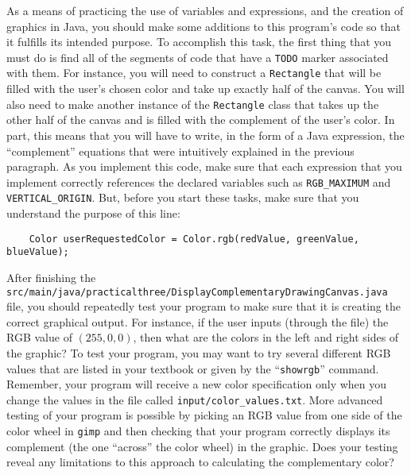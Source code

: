 \documentclass[11pt]{article}
\newcommand{\mainprogramsource}{\lstinline{src/main/java/practicalthree/DisplayComplementaryDrawingCanvas.java}}
\newcommand{\command}[1]{``\lstinline{#1}''}
\newcommand{\program}[1]{\lstinline{#1}}
\begin{document}
As a means of practicing the use of variables and expressions, and the creation
of graphics in Java, you should make some additions to this program's code so
that it fulfills its intended purpose. To accomplish this task, the first thing
that you must do is find all of the segments of code that have a \program{TODO}
marker associated with them. For instance, you will need to construct a
\program{Rectangle} that will be filled with the user's chosen color and take up
exactly half of the canvas. You will also need to make another instance of the
\program{Rectangle} class that takes up the other half of the canvas and is
filled with the complement of the user's color. In part, this means that you
will have to write, in the form of a Java expression, the ``complement''
equations that were intuitively explained in the previous paragraph. As you
implement this code, make sure that each expression that you implement correctly
references the declared variables such as \program{RGB_MAXIMUM} and
\program{VERTICAL_ORIGIN}. But, before you start these tasks, make sure that you
understand the purpose of this line:

\begin{verbatim}
    Color userRequestedColor = Color.rgb(redValue, greenValue, blueValue);
\end{verbatim}



After finishing the \mainprogramsource{} file, you should repeatedly test your
program to make sure that it is creating the correct graphical output. For
instance, if the user inputs (through the file) the RGB value of $(255, 0, 0)$,
then what are the colors in the left and right sides of the graphic? To test
your program, you may want to try several different RGB values that are listed
in your textbook or given by the \command{showrgb} command. Remember, your
program will receive a new color specification only when you change the values
in the file called \program{input/color_values.txt}. More advanced testing of
your program is possible by picking an RGB value from one side of the color
wheel in {\tt gimp} and then checking that your program correctly displays its
complement (the one ``across'' the color wheel) in the graphic. Does your
testing reveal any limitations to this approach to calculating the complementary
color?
\end{document}
